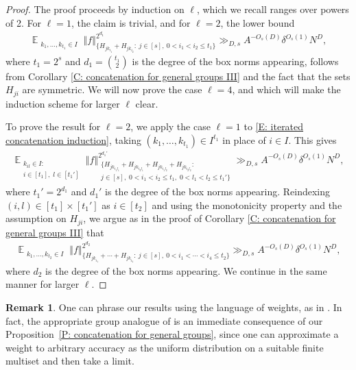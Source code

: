 \documentclass[11pt]{amsart}
\theoremstyle{definition}
\newtheorem{remark}[lemma]{Remark}
\DeclareMathOperator*{\E}{\mathbb{E}}
\newcommand{\norm}[1]{\left\Vert #1\right\Vert}
\begin{document}
\begin{proof}
    The proof proceeds by induction on $\ell$, which we recall ranges over powers of 2. For $\ell=1$, the claim is trivial, and for $\ell=2$, the lower bound
    \begin{align}\label{E: iterated concatenation induction}
        \E_{\substack{k_1, \ldots, k_{t_1}\in I}}\norm{f}_{\{H_{j k_{i_1}}+H_{j k_{i_2}}:\ j\in[s],\ 0<i_1< i_2\leq t_1\}}^{2^{d_1}}\gg_{D,  s} A^{-O_{s}(D)} \delta^{O_{s}(1)} N^D,
    \end{align}
    where $t_1 = 2^s$ and $d_1 = {{t_1}\choose{2}}$ is the degree of the box norms appearing, follows from Corollary \ref{C: concatenation for general groups III} and the fact that the sets $H_{ji}$ are symmetric. We will now prove the case $\ell=4$, and which will make the induction scheme for larger $\ell$ clear.

    To prove the result for $\ell=2$, we apply the case $\ell=1$ to \eqref{E: iterated concatenation induction}, taking $(k_1, \ldots, k_{t_1})\in I^{t_1}$ in place of $i\in I$. This gives
    \begin{align}\label{E: iterated concatenation induction 2}
        \E_{\substack{k_{i l}\in I:\\ i\in[t_1],\; l\in[t_1']}}\norm{f}_{\substack{\{H_{j k_{i_1l_1}}+H_{j k_{i_2l_1}} + H_{j k_{i_1l_2}}+H_{j k_{i_2l_2}}:\\ j\in[s],\; 0<i_1< i_2\leq t_1,\; 0<l_1<l_2\leq t_1'\}}}^{2^{d_1'}}\gg_{D, s} A^{-O_{s}(D)} \delta^{O_{s}(1)} N^D,
    \end{align}
    where $t_1' = 2^{d_1}$ and $d_1'$ is the degree of the box norms appearing. Reindexing $(i, l)\in[t_1]\times[t_1']$ as $i\in[t_2]$ and using the monotonicity property and the assumption on $H_{ji}$, we argue as in the proof of Corollary \ref{C: concatenation for general groups III} that
    \begin{align*}
                \E_{\substack{k_1, \ldots, k_{t_2}\in I}}\norm{f}_{\{H_{j k_{i_1}}+\cdots + H_{j k_{i_4}}:\ j\in[s],\ 0<i_1< \cdots < i_4\leq t_2\}}^{2^{d_2}}\gg_{D, s} A^{-O_s(D)} \delta^{O_{s}(1)} N^D,
    \end{align*}
    where $d_2$ is the degree of the box norms appearing.  We continue in the same manner for larger $\ell$.
\end{proof}

\begin{remark}
One can phrase our results using the language of weights, as in \cite[Lemma 5.5]{GS25}. In fact, the appropriate group analogue of \cite[Lemma 5.5]{GS25} is an immediate consequence of our Proposition~\ref{P: concatenation for general groups}, since one can approximate a weight to arbitrary accuracy as the uniform distribution on a suitable finite multiset and then take a limit.
\end{remark}
\end{document}
